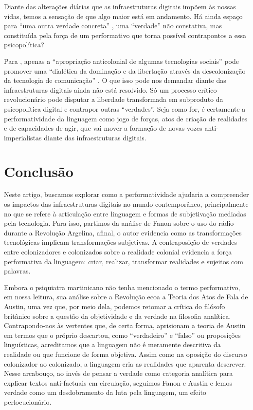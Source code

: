 \documentclass[portuguese]{textolivre}
\begin{document}
Diante das alterações diárias que as infraestruturas digitais impõem às nossas vidas, temos a sensação de que algo maior está em andamento. Há ainda espaço para “uma outra verdade concreta” \cite{fanon2021argelia}, uma “verdade” não constativa, mas constituída pela força de um performativo que torna possível contrapontos a essa psicopolítica?

Para \textcite{fanon2021argelia}, apenas a “apropriação anticolonial de algumas tecnologias sociais” \cite[p. 186]{faustino2023colonialismo} pode promover uma “dialética da dominação e da libertação através da descolonização da tecnologia de comunicação” \cite[p. 187]{faustino2023colonialismo}. O que isso pode nos demandar diante das infraestruturas digitais ainda não está resolvido. Só um processo crítico revolucionário pode disputar a liberdade transformada em subproduto da psicopolítica digital \cite[p. 72–73]{han2023psicopolitica} e contrapor outras “verdades”. Seja como for, é certamente a performatividade da linguagem como jogo de forças, atos de criação de realidades e de capacidades de agir, que vai mover a formação de novas vozes anti-imperialistas diante das infraestruturas digitais.


\section{Conclusão}\label{sec-formato}
Neste artigo, buscamos explorar como a performatividade ajudaria a compreender os impactos das infraestruturas digitais no mundo contemporâneo, principalmente no que se refere à articulação entre linguagem e formas de subjetivação mediadas pela tecnologia. Para isso, partimos da análise de Fanon sobre o uso do rádio durante a Revolução Argelina, afinal, o autor evidencia como as transformações tecnológicas implicam transformações subjetivas. A contraposição de verdades entre colonizadores e colonizados sobre a realidade colonial evidencia a força performativa da linguagem: criar, realizar, transformar realidades e sujeitos com palavras.

Embora o psiquiatra martinicano não tenha mencionado o termo performativo, em nossa leitura, sua análise sobre a Revolução ecoa a Teoria dos Atos de Fala de Austin, uma vez que, por meio dela, podemos retomar a crítica do filósofo britânico sobre a questão da objetividade e da verdade na filosofia analítica. Contrapondo-nos às vertentes que, de certa forma, aprisionam a teoria de Austin em termos que o próprio descartou, como “verdadeiro” e “falso” ou proposições linguísticas, acreditamos que a linguagem não é meramente descritiva da realidade ou que funcione de forma objetiva. Assim como na oposição do discurso colonizador ao colonizado, a linguagem cria as realidades que aparenta descrever. Nesse arcabouço, ao invés de pensar a verdade como categoria analítica para explicar textos anti-factuais em circulação, seguimos Fanon e Austin e lemos verdade como um desdobramento da luta pela linguagem, um efeito perlocucionário.
\end{document}
